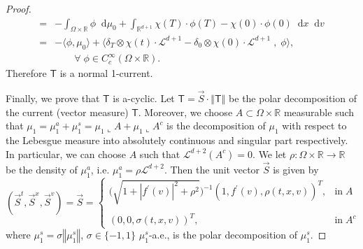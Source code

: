\documentclass[11pt, twoside, reqno]{amsart}
\theoremstyle{definition}
\theoremstyle{remark}
\numberwithin{equation}{section}
\newcommand*\dif{\mathop{}\!\mathrm{d}}
\newcommand{\ms}[1]{\mathsf{#1}}
\newcommand{\msc}[1]{\mathscr{#1}}
\begin{document}
\begin{proof}
\begin{equation}
\begin{aligned}
     =& - \int_{\Omega \times \mathbb R}  \phi \dif \mu_0 + \int_{\mathbb R^{d+1}} \chi(T) \cdot  \phi(T) - \chi(0) \cdot  \phi(0) \dif x \dif v \\
     =& -\big\langle \phi, \mu_0 \big\rangle + \Big\langle \delta_T\otimes \chi(t)\cdot \msc L^{d+1} -\delta_0\otimes \chi(0)\cdot \msc L^{d+1} \; , \; \phi \Big\rangle, \\
    & \qquad \forall \; \phi \in C^\infty_c(\Omega \times \mathbb R).
\end{aligned}
\end{equation}
Therefore $\ms T$ is a normal 1-current. 


Finally, we  prove that $\ms T$ is a-cyclic. Let $\ms T = \vec {S} \cdot \left\Vert \ms T \right\Vert$ be the polar decomposition of the current (vector measure) $\ms T$. Moreover, we choose $A\subset \Omega \times \mathbb R$ measurable such that $\mu_1 = \mu_1^a + \mu_1^s =  \mu_1 \llcorner A + \mu_1\llcorner A^c$ is the decomposition of $\mu_1$ with respect to the Lebesgue measure into absolutely continuous and singular part respectively. In  particular, we can choose $A$ such that $\msc L^{d+2}(A^c) = 0$.
We let $\rho: \Omega \times \mathbb R \to \mathbb R$ be the density of $\mu^a_1$, i.e. $\mu_1^a=  \rho\msc L^{d+2}$.
Then the unit vector $\vec S$ is given by 
$$
(\vec S^t, \vec S^x, \vec S^v) = \vec S= \begin{cases}
\Big(\sqrt{1+\left|f^{\prime}(v)\right|^2 + \rho^2}\Big)^{-1}(1, f^{\prime}(v), \rho(t, x, v))^T, & \text{in} \; A\\
\\
(0, 0, \sigma(t,x,v))^T, & \text{in} \; A^c
\end{cases}
$$
where $\mu^s_1 = \sigma \left\Vert \mu^s_1\right\Vert$, $\sigma \in \{-1, 1\}$ $\mu^s_1$-a.e., is the polar decomposition of $\mu^s_1$.



\end{proof}
\end{document}
